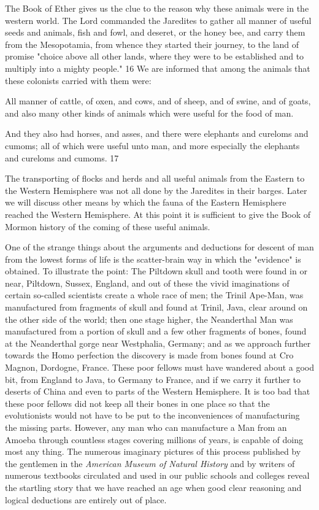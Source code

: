 The Book of Ether gives us the clue to the reason why these animals were in the western
world. The Lord commanded the Jaredites to gather all manner of useful seeds and animals,
fish and fowl, and deseret, or the honey bee, and carry them from the Mesopotamia, from
whence they started their journey, to the land of promise "choice above all other lands, where
they were to be established and to multiply into a mighty people." 16 We are informed that
among the animals that these colonists carried with them were:

All manner of cattle, of oxen, and cows, and of sheep, and of swine, and of goats, and also
many other kinds of animals which were useful for the food of man.

And they also had horses, and asses, and there were elephants and cureloms and cumoms; all
of which were useful unto man, and more especially the elephants and cureloms and
cumoms. 17

The transporting of flocks and herds and all useful animals from the Eastern to the Western
Hemisphere was not all done by the Jaredites in their barges. Later we will discuss other
means by which the fauna of the Eastern Hemisphere reached the Western Hemisphere. At
this point it is sufficient to give the Book of Mormon history of the coming of these useful
animals.

One of the strange things about the arguments and deductions for descent of man from the
lowest forms of life is the scatter-brain way in which the "evidence" is obtained. To illustrate
the point: The Piltdown skull and tooth were found in or near, Piltdown, Sussex, England,
and out of these the vivid imaginations of certain so-called scientists create a whole race of
men; the Trinil Ape-Man, was manufactured from fragments of skull and found at Trinil,
Java, clear around on the other side of the world; then one stage higher, the Neanderthal Man
was manufactured from a portion of skull and a few other fragments of bones, found at the
Neanderthal gorge near Westphalia, Germany; and as we approach further towards the Homo
perfection the discovery is made from bones found at Cro Magnon, Dordogne, France. These
poor fellows must have wandered about a good bit, from England to Java, to Germany to
France, and if we carry it further to deserts of China and even to parts of the Western
Hemisphere. It is too bad that these poor fellows did not keep all their bones in one place so
that the evolutionists would not have to be put to the inconveniences of manufacturing the
missing parts. However, any man who can manufacture a Man from an Amoeba through
countless stages covering millions of years, is capable of doing most any thing. The
numerous imaginary pictures of this process published by the gentlemen in the \textit{American
Museum of Natural History} and by writers of numerous textbooks circulated and used in our
public schools and colleges reveal the startling story that we have reached an age when good
clear reasoning and logical deductions are entirely out of place.

